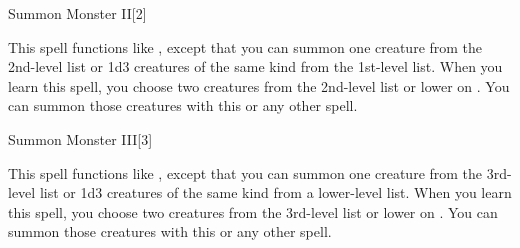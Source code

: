 \begin{spellsection}{Summon Monster II}[2]
    \begin{spellheader}
    \end{spellheader}
    \begin{spellcontent}
        \begin{spelltargetinginfo}
        \end{spelltargetinginfo}
        \begin{spelleffects}
            \spellspecial This spell functions like , except that you can summon one creature from the 2nd-level list or 1d3 creatures of the same kind from the 1st-level list. When you learn this spell, you choose two creatures from the 2nd-level list or lower on . You can summon those creatures with this or any other  spell.
            \spelldur \durshort \dismissable
        \end{spelleffects}
    \end{spellcontent}
    \begin{spellfooter}
        \miscastexplode
    \end{spellfooter}
\end{spellsection}

\begin{spellsection}{Summon Monster III}[3]
    \begin{spellheader}
    \end{spellheader}
    \begin{spellcontent}
        \begin{spelltargetinginfo}
        \end{spelltargetinginfo}
        \begin{spelleffects}
            \spellspecial This spell functions like , except that you can summon one creature from the 3rd-level list or 1d3 creatures of the same kind from a lower-level list. When you learn this spell, you choose two creatures from the 3rd-level list or lower on . You can summon those creatures with this or any other  spell.
            \spelldur \durshort \dismissable
        \end{spelleffects}
    \end{spellcontent}
    \begin{spellfooter}
        \miscastexplode
    \end{spellfooter}
\end{spellsection}

